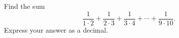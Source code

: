 Find the sum
\[
\dfrac{1}{1\cdot2}+\dfrac{1}{2\cdot3}+\dfrac{1}{3\cdot4}+\cdots+\dfrac{1}{9\cdot10}.
\]
Express your answer as a decimal.
